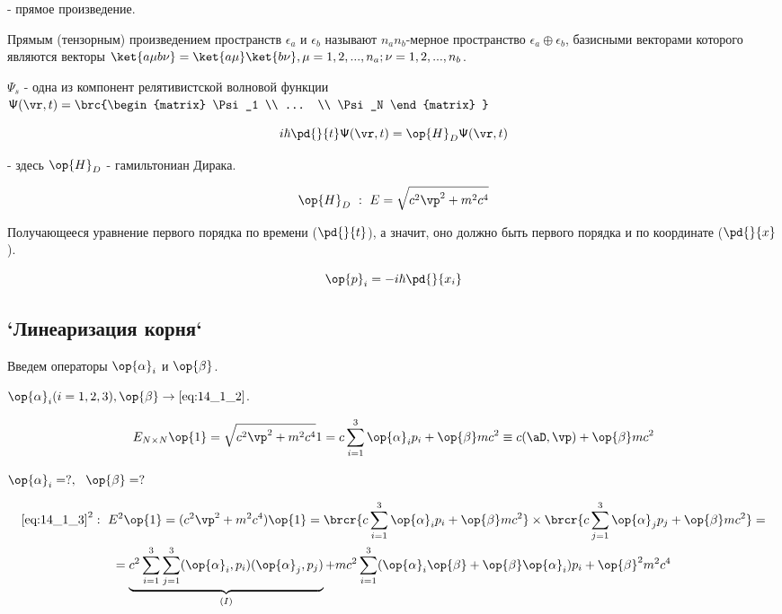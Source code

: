  - прямое произведение.
 
\begin{defn}
Прямым (тензорным) произведением пространств $\epsilon_a$ и $\epsilon_b$ называют $n_a n_b$-мерное пространство $\epsilon_a \oplus \epsilon_b$, базисными векторами которого являются векторы $\ket{a \mu b \nu} = \ket{a \mu}\ket{b \nu}, \mu = 1, 2, ..., n_a; \nu = 1, 2, ..., n_b$.
\end{defn}

$\Psi_s$ - одна из компонент релятивистской волновой функции $\mathsf{\Psi}(\vr, t) = 
\brc{\begin{matrix}
\Psi_1 \\
... \\
\Psi_N
\end{matrix} }
$

\begin{equation}
\label{eq:14_1_1}
i\hbar \pd{}{t} \mathsf{\Psi}(\vr, t) = \op{H}_D \mathsf{\Psi}(\vr, t)
\end{equation}

 - здесь $ \op{H}_D$ - гамильтониан Дирака.

 \begin{equation}
\label{eq:14_1_2}
\op{H}_D~:~E = \sqrt{c^2 \vp^2 + m^2 c^4}
\end{equation}
 
 Получающееся уравнение первого порядка по времени ($\pd{}{t}$), а значит, оно должно быть первого порядка и по координате ($\pd{}{x}$).
 
$$
\op{p}_i = - i\hbar \pd{}{x_i}
$$

\subsection{`Линеаризация корня`}

Введем операторы $\op{\alpha}_i$ и $\op{\beta}$.

$\op{\alpha}_i (i = 1, 2, 3), \op{\beta} \to \eqref{eq:14_1_2}$.

\begin{equation}
\label{eq:14_1_3}
E_{N \times N} \op{1} = \sqrt{c^2 \vp^2 + m^2 c^4} 1 = c \sum_{i=1}^3 \op{\alpha}_i p_i + \op{\beta} mc^2 \equiv c(\aD, \vp) + \op{\beta} mc^2
\end{equation}

$\op{\alpha}_i = ?,~~\op{\beta} = ?$

\begin{gather}
\eqref{eq:14_1_3}^2:~E^2 \op{1} = (c^2 \vp^2 + m^2 c^4)\op{1} = \brcr{c \sum_{i=1}^3 \op{\alpha}_i p_i + \op{\beta} mc^2} \times \brcr{c \sum_{j=1}^3 \op{\alpha}_j p_j + \op{\beta} mc^2} = \nonumber \\
\label{eq:14_1_4}
= \underbrace{c^2 \sum_{i=1}^3 \sum_{j = 1}^3 (\op{\alpha}_i, p_i)(\op{\alpha}_j, p_j)}_{(I)} + mc^2 \sum_{i=1}^3 (\op{\alpha}_i \op{\beta} + \op{\beta} \op{\alpha}_i) p_i + \op{\beta}^2 m^2 c^4
\end{gather} 

